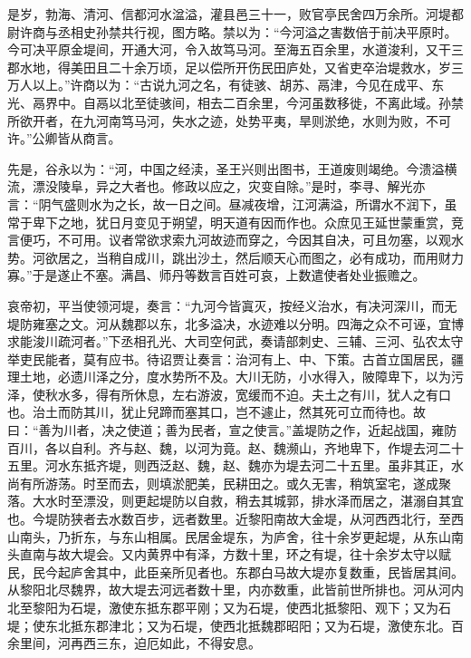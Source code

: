 \documentclass[12pt,UTF8]{ctexbook}
\begin{document}
是岁，勃海、清河、信都河水湓溢，灌县邑三十一，败官亭民舍四万余所。河堤都尉许商与丞相史孙禁共行视，图方略。禁以为：“今河溢之害数倍于前决平原时。今可决平原金堤间，开通大河，令入故笃马河。至海五百余里，水道浚利，又干三郡水地，得美田且二十余万顷，足以偿所开伤民田庐处，又省吏卒治堤救水，岁三万人以上。”许商以为：“古说九河之名，有徒骇、胡苏、鬲津，今见在成平、东光、鬲界中。自鬲以北至徒骇间，相去二百余里，今河虽数移徙，不离此域。孙禁所欲开者，在九河南笃马河，失水之迹，处势平夷，旱则淤绝，水则为败，不可许。”公卿皆从商言。



先是，谷永以为：“河，中国之经渎，圣王兴则出图书，王道废则竭绝。今溃溢横流，漂没陵阜，异之大者也。修政以应之，灾变自除。”是时，李寻、解光亦言：“阴气盛则水为之长，故一日之间。昼减夜增，江河满溢，所谓水不润下，虽常于卑下之地，犹日月变见于朔望，明天道有因而作也。众庶见王延世蒙重赏，竞言便巧，不可用。议者常欲求索九河故迹而穿之，今因其自决，可且勿塞，以观水势。河欲居之，当稍自成川，跳出沙土，然后顺天心而图之，必有成功，而用财力寡。”于是遂止不塞。满昌、师丹等数言百姓可哀，上数遣使者处业振赡之。



哀帝初，平当使领河堤，奏言：“九河今皆寘灭，按经义治水，有决河深川，而无堤防雍塞之文。河从魏郡以东，北多溢决，水迹难以分明。四海之众不可诬，宜博求能浚川疏河者。”下丞相孔光、大司空何武，奏请部刺史、三辅、三河、弘农太守举吏民能者，莫有应书。待诏贾让奏言：治河有上、中、下策。古首立国居民，疆理土地，必遗川泽之分，度水势所不及。大川无防，小水得入，陂障卑下，以为污泽，使秋水多，得有所休息，左右游波，宽缓而不迫。夫土之有川，犹人之有口也。治土而防其川，犹止兒蹄而塞其口，岂不遽止，然其死可立而待也。故曰：“善为川者，决之使道；善为民者，宣之使言。”盖堤防之作，近起战国，雍防百川，各以自利。齐与赵、魏，以河为竟。赵、魏濒山，齐地卑下，作堤去河二十五里。河水东抵齐堤，则西泛赵、魏，赵、魏亦为堤去河二十五里。虽非其正，水尚有所游荡。时至而去，则填淤肥美，民耕田之。或久无害，稍筑室宅，遂成聚落。大水时至漂没，则更起堤防以自救，稍去其城郭，排水泽而居之，湛溺自其宜也。今堤防狭者去水数百步，远者数里。近黎阳南故大金堤，从河西西北行，至西山南头，乃折东，与东山相属。民居金堤东，为庐舍，往十余岁更起堤，从东山南头直南与故大堤会。又内黄界中有泽，方数十里，环之有堤，往十余岁太守以赋民，民今起庐舍其中，此臣亲所见者也。东郡白马故大堤亦复数重，民皆居其间。从黎阳北尽魏界，故大堤去河远者数十里，内亦数重，此皆前世所排也。河从河内北至黎阳为石堤，激使东抵东郡平刚；又为石堤，使西北抵黎阳、观下；又为石堤；使东北抵东郡津北；又为石堤，使西北抵魏郡昭阳；又为石堤，激使东北。百余里间，河再西三东，迫厄如此，不得安息。
\end{document}
